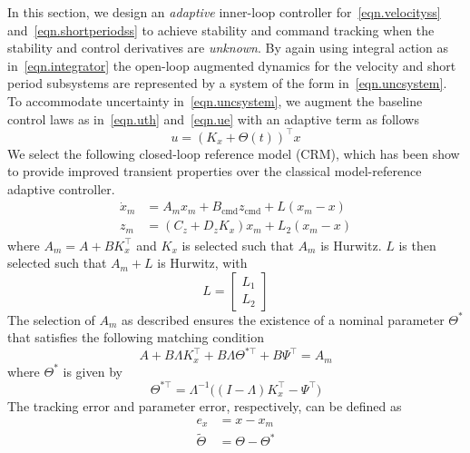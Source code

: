 \documentclass[]{../sty/aiaa-tc}
\theoremstyle{examplestyle}
\begin{document}
  In this section, we design an \textit{adaptive} inner-loop controller for\ \eqref{eqn.velocityss} and\ \eqref{eqn.shortperiodss} to achieve stability and command tracking when the stability and control derivatives are \textit{unknown}.
  By again using integral action as in\ \eqref{eqn.integrator} the open-loop augmented dynamics for the velocity and short period subsystems are represented by a system of the form in\ \eqref{eqn.uncsystem}.
  To accommodate uncertainty in\ \eqref{eqn.uncsystem}, we augment the baseline control laws as in\ \eqref{eqn.uth} and\ \eqref{eqn.ue} with an adaptive term as follows
  \begin{equation}
    \label{eqn.u}
    u = (K_{x}+\Theta(t))^{\top}x
  \end{equation}
  We select the following closed-loop reference model (CRM), which has been show to provide improved transient properties over the classical model-reference adaptive controller.\cite{gibson.aiaacrm.2012,gibson.ecc.2013,gibson.ieeeaccess.2013,gibson.acc.2013}
  \begin{equation}
    \label{eqn.refmodel}
    \begin{split}
      \dot{x}_{m} &= A_{m}x_{m} + B_{\text{cmd}}z_{\text{cmd}} + L(x_{m}-x) \\
      z_{m} &= (C_{z} + D_{z}K_{x})x_{m} + L_{2}(x_{m}-x)
    \end{split}
  \end{equation}
  where $A_{m} = A + BK_{x}^{\top}$ and $K_{x}$ is selected such that $A_{m}$ is Hurwitz.
  $L$ is then selected such that $A_{m}+L$ is Hurwitz, with
  \begin{equation*}
    L =
    \begin{bmatrix}
      L_{1} \\
      L_{2}
    \end{bmatrix}
  \end{equation*}
  The selection of $A_{m}$ as described ensures the existence of a nominal parameter $\Theta^{*}$ that satisfies the following matching condition
  \begin{equation*}
    A + B\Lambda K_{x}^{\top} + B\Lambda\Theta^{*\top} + B\Psi^{\top} = A_{m}
  \end{equation*}
  where $\Theta^{*}$ is given by
  \begin{equation*}
    \Theta^{*\top}= \Lambda^{-1}\bigr((I - \Lambda)K_{x}^{\top} - \Psi^{\top}\bigr)
  \end{equation*}
  The tracking error and parameter error, respectively, can be defined as
  \begin{equation*}
    \begin{split}
      e_{x} &= x - x_{m} \\
      \widetilde{\Theta} &= \Theta - \Theta^{*} \\
    \end{split}
  \end{equation*}
\end{document}
